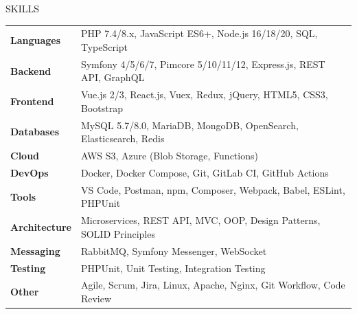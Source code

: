 \documentclass{resume} %
\begin{document}
\begin{rSection}{SKILLS}

\begin{tabular}{ @{} >{\bfseries}l @{\hspace{6ex}} l }
Languages & PHP 7.4/8.x, JavaScript ES6+, Node.js 16/18/20, SQL, TypeScript\\
Backend & Symfony 4/5/6/7, Pimcore 5/10/11/12, Express.js, REST API, GraphQL\\
Frontend & Vue.js 2/3, React.js, Vuex, Redux, jQuery, HTML5, CSS3, Bootstrap\\
Databases & MySQL 5.7/8.0, MariaDB, MongoDB, OpenSearch, Elasticsearch, Redis\\
Cloud & AWS S3, Azure (Blob Storage, Functions)\\
DevOps & Docker, Docker Compose, Git, GitLab CI, GitHub Actions\\
Tools & VS Code, Postman, npm, Composer, Webpack, Babel, ESLint, PHPUnit\\
Architecture & Microservices, REST API, MVC, OOP, Design Patterns, SOLID Principles\\
Messaging & RabbitMQ, Symfony Messenger, WebSocket\\
Testing & PHPUnit, Unit Testing, Integration Testing\\
Other & Agile, Scrum, Jira, Linux, Apache, Nginx, Git Workflow, Code Review\\
\end{tabular}\\
\end{rSection}

\end{document}

